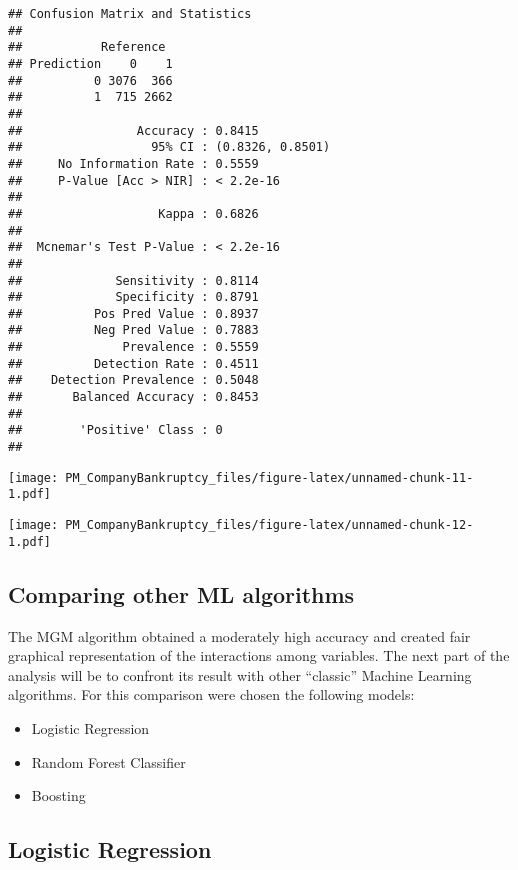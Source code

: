 \documentclass[
]{article}
\begin{document}
\begin{verbatim}
## Confusion Matrix and Statistics
## 
##           Reference
## Prediction    0    1
##          0 3076  366
##          1  715 2662
##                                           
##                Accuracy : 0.8415          
##                  95% CI : (0.8326, 0.8501)
##     No Information Rate : 0.5559          
##     P-Value [Acc > NIR] : < 2.2e-16       
##                                           
##                   Kappa : 0.6826          
##                                           
##  Mcnemar's Test P-Value : < 2.2e-16       
##                                           
##             Sensitivity : 0.8114          
##             Specificity : 0.8791          
##          Pos Pred Value : 0.8937          
##          Neg Pred Value : 0.7883          
##              Prevalence : 0.5559          
##          Detection Rate : 0.4511          
##    Detection Prevalence : 0.5048          
##       Balanced Accuracy : 0.8453          
##                                           
##        'Positive' Class : 0               
## 
\end{verbatim}

\texttt{[image: PM\_CompanyBankruptcy\_files/figure-latex/unnamed-chunk-11-1.pdf]}

\texttt{[image: PM\_CompanyBankruptcy\_files/figure-latex/unnamed-chunk-12-1.pdf]}

\hypertarget{comparing-other-ml-algorithms}{%
\subsection{Comparing other ML
algorithms}\label{comparing-other-ml-algorithms}}

The MGM algorithm obtained a moderately high accuracy and created fair
graphical representation of the interactions among variables. The next
part of the analysis will be to confront its result with other
``classic'' Machine Learning algorithms. For this comparison were chosen
the following models:

\begin{itemize}
\item
  Logistic Regression
\item
  Random Forest Classifier
\item
  Boosting
\end{itemize}

\hypertarget{logistic-regression}{%
\subsection{Logistic Regression}\label{logistic-regression}}
\end{document}
